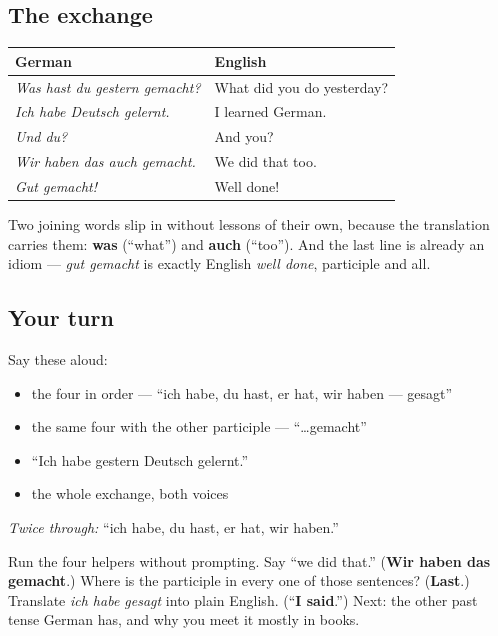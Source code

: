 \subsection*{The exchange}
\noindent
\begin{tabularx}{\linewidth}{@{}>{\raggedright\arraybackslash}X>{\raggedright\arraybackslash}X@{}}
\toprule
\textbf{German} & \textbf{English} \\
\midrule
\emph{Was hast du gestern gemacht?} & What did you do yesterday? \\
\emph{Ich habe Deutsch gelernt.} & I learned German. \\
\emph{Und du?} & And you? \\
\emph{Wir haben das auch gemacht.} & We did that too. \\
\emph{Gut gemacht!} & Well done! \\
\bottomrule
\end{tabularx}

Two joining words slip in without lessons of their own, because the translation carries them: \textbf{was} (\textquotedblleft{}what\textquotedblright{}) and \textbf{auch} (\textquotedblleft{}too\textquotedblright{}). And the last line is already an idiom — \emph{gut gemacht} is exactly English \emph{well done}, participle and all.

\subsection*{Your turn}
Say these aloud:

\begin{itemize}
\raggedright
  \item the four in order — \textquotedblleft{}ich habe, du hast, er hat, wir haben — gesagt\textquotedblright{}
  \item the same four with the other participle — \textquotedblleft{}…gemacht\textquotedblright{}
  \item \textquotedblleft{}Ich habe gestern Deutsch gelernt.\textquotedblright{}
  \item the whole exchange, both voices
\end{itemize}

\emph{Twice through:} \textquotedblleft{}ich habe, du hast, er hat, wir haben.\textquotedblright{}

\begin{tcolorbox}[breakable,colback=teal!4,colframe=teal!35!black,title={Before you move on}]
Run the four helpers without prompting. Say \textquotedblleft{}we did that.\textquotedblright{} (\textbf{Wir haben das gemacht}.) Where is the participle in every one of those sentences? (\textbf{Last}.) Translate \emph{ich habe gesagt} into plain English. (\textquotedblleft{}\textbf{I said}.\textquotedblright{}) Next: the other past tense German has, and why you meet it mostly in books.
\end{tcolorbox}
